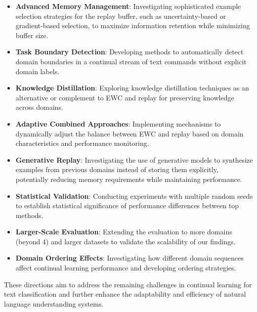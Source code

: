 \documentclass[conference]{IEEEtran}
\begin{document}
\begin{itemize}
    \item \textbf{Advanced Memory Management}: Investigating sophisticated example selection strategies for the replay buffer, such as uncertainty-based or gradient-based selection, to maximize information retention while minimizing buffer size.
    \item \textbf{Task Boundary Detection}: Developing methods to automatically detect domain boundaries in a continual stream of text commands without explicit domain labels.
    \item \textbf{Knowledge Distillation}: Exploring knowledge distillation techniques as an alternative or complement to EWC and replay for preserving knowledge across domains.
    \item \textbf{Adaptive Combined Approaches}: Implementing mechanisms to dynamically adjust the balance between EWC and replay based on domain characteristics and performance monitoring.
    \item \textbf{Generative Replay}: Investigating the use of generative models to synthesize examples from previous domains instead of storing them explicitly, potentially reducing memory requirements while maintaining performance.
    \item \textbf{Statistical Validation}: Conducting experiments with multiple random seeds to establish statistical significance of performance differences between top methods.
    \item \textbf{Larger-Scale Evaluation}: Extending the evaluation to more domains (beyond 4) and larger datasets to validate the scalability of our findings.
    \item \textbf{Domain Ordering Effects}: Investigating how different domain sequences affect continual learning performance and developing ordering strategies.
\end{itemize}

These directions aim to address the remaining challenges in continual learning for text classification and further enhance the adaptability and efficiency of natural language understanding systems.
\end{document}
